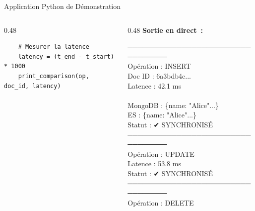 \documentclass[aspectratio=169]{beamer}
\begin{document}
\begin{frame}[fragile]{Application Python de Démonstration}
\begin{columns}[T]
\begin{column}{0.48\textwidth}
\begin{tcolorbox}[codebox]
\begin{verbatim}
    # Mesurer la latence
    latency = (t_end - t_start) * 1000
    print_comparison(op, doc_id, latency)
\end{verbatim}
      \end{tcolorbox}
    \end{column}
    \begin{column}{0.48\textwidth}
      \textbf{\color{accent} Sortie en direct~:}
      \begin{tcolorbox}[card, colback=black, colframe=black, coltext=green!80!white, fontupper=\ttfamily\scriptsize]
        ─────────────────────────────────\\
        \hspace*{0.1cm}Opération : INSERT\\
        \hspace*{0.1cm}Doc ID \hspace*{0.4cm}: 6a3bdb4c...\\
        \hspace*{0.1cm}Latence \hspace*{0.3cm}: \textcolor{accent}{42.1 ms}\\
        \\
        \hspace*{0.1cm}MongoDB \hspace*{0.3cm}: \{name: "Alice"...\}\\
        \hspace*{0.1cm}ES \hspace*{0.85cm}: \{name: "Alice"...\}\\
        \hspace*{0.1cm}Statut \hspace*{0.45cm}: \textcolor{green!80!white}{✔ SYNCHRONISÉ}\\
        ─────────────────────────────────\\
        \hspace*{0.1cm}Opération : UPDATE\\
        \hspace*{0.1cm}Latence \hspace*{0.3cm}: \textcolor{accent}{53.8 ms}\\
        \hspace*{0.1cm}Statut \hspace*{0.45cm}: \textcolor{green!80!white}{✔ SYNCHRONISÉ}\\
        ─────────────────────────────────\\
        \hspace*{0.1cm}Opération : DELETE\\

\end{tcolorbox}
\end{column}
\end{columns}
\end{frame}
\end{document}
